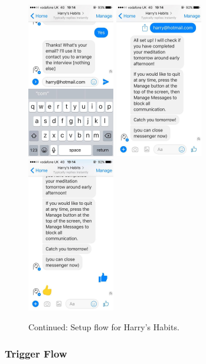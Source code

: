 \begin{figure}[H]
  \centering
  \includegraphics[width=1.5in]{resources/design/process/13.jpg}
  \hspace{10px}
  \includegraphics[width=1.5in]{resources/design/process/14.jpg}
  \hspace{10px}
  \includegraphics[width=1.5in]{resources/design/process/15.jpg}
  \caption{Continued: Setup flow for Harry's Habits.}
  \label{fig:setup_flow_screenshots_2}
\end{figure}


\subsubsection{Trigger Flow} \label{trigger_flow}

